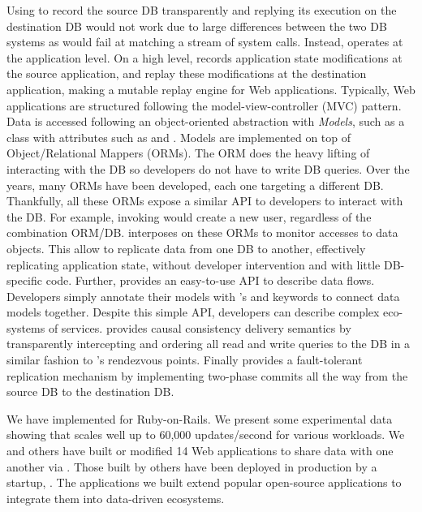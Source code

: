 Using \dora to record the source DB transparently and replying its execution on
the destination DB would not work due to large differences between the two DB systems
as \dora would fail at matching a stream of system calls.
Instead, \synapse operates at the application level.
On a high level, \synapse records application state modifications at the source
application, and replay these modifications at the destination application,
making \synapse a mutable replay engine for Web applications.
Typically, Web applications are structured following
the model-view-controller (MVC) pattern. Data is accessed following an object-oriented
abstraction with {\em Models}, such as a  class with attributes such
as  and . Models are implemented on top of
Object/Relational Mappers (ORMs).
The ORM does the heavy lifting of interacting with the DB so developers
do not have to write DB queries. Over the years, many ORMs have been developed,
each one targeting a different DB. Thankfully, all these ORMs expose a similar API
to developers to interact with the DB. For example, invoking
 would create a new user, regardless of the combination
ORM/DB.  \synapse interposes on these ORMs to monitor accesses to data objects.
This allow \synapse to replicate data from
one DB to another, effectively replicating application state,
without developer intervention and with little DB-specific code.
Further, \synapse provides an easy-to-use API to describe data flows. Developers simply
annotate their models with \synapse's  and 
keywords to connect data models together.
Despite this simple API, developers can describe complex eco-systems
of services. \synapse provides causal consistency delivery semantics by
transparently intercepting and ordering all read and write queries to the DB in
a similar fashion to \scribe's rendezvous points. Finally \synapse provides
a fault-tolerant replication mechanism by implementing two-phase commits all
the way from the source DB to the destination DB.

We have implemented \synapse for Ruby-on-Rails. We present some experimental
data showing that \synapse scales well up to 60,000 updates/second for various
workloads.  We and others have built or modified 14 Web applications to share
data with one another via \synapse. Those built by others have been deployed in
production by a startup, \crowdtap.  The applications we built extend popular
open-source applications to integrate them into data-driven ecosystems.

